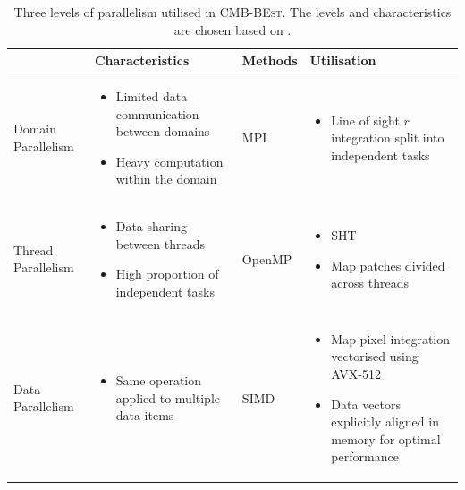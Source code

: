 \begin{table}[h]
	\caption{Three levels of parallelism utilised in \textsc{CMB-BEst}. The levels and characteristics are chosen based on \cite{Jeffers2016intel}.}
	\centering
	\label{table:three_levels_of_parallelism}
	\renewcommand{\arraystretch}{1.5} 
	\begin{tabular}{m{}   m{}   m{}   m{}} \toprule
		 & Characteristics & Methods & Utilisation \\
		
		\midrule
		Domain \newline Parallelism &
		\begin{itemize}[leftmargin=*]
			\item Limited data communication between domains
			\item Heavy computation within the domain
		\end{itemize} &
		MPI &
		\begin{itemize}[leftmargin=*]
			\item Line of sight $r$ integration split into independent tasks
		\end{itemize}  \\
	
		\midrule
		Thread \newline Parallelism &
		\begin{itemize}[leftmargin=*]
			\item Data sharing between threads
			\item High proportion of independent tasks
		\end{itemize} &
		OpenMP &
		\begin{itemize}[leftmargin=*]
			\item SHT
			\item Map patches divided across threads
		\end{itemize}  \\	
	
		\midrule
		Data \newline Parallelism &
		\begin{itemize}[leftmargin=*]
			\item Same operation applied to multiple data items
		\end{itemize} &
		SIMD &
		\begin{itemize}[leftmargin=*]
			\item Map pixel integration vectorised using AVX-512
			\item Data vectors explicitly aligned in memory for optimal performance 
		\end{itemize} \\	
			
		\bottomrule
	\end{tabular}
\end{table}

